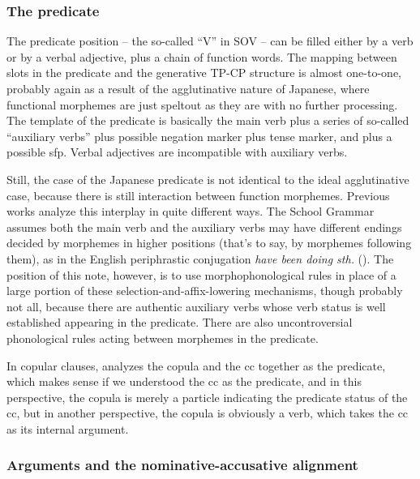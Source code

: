 \documentclass[UTF8, a4paper, oneside, scheme=plain]{ctexart}
\newcommand{\corpus}[1]{\emph{#1}}
\begin{document}
\subsubsection{The predicate}\label{sec:predicate-abs}

The predicate position -- the so-called ``V'' in SOV -- 
can be filled either by a verb or by a verbal adjective,
plus a chain of function words.
The mapping between slots in the predicate and the generative TP-CP structure is almost one-to-one,
probably again as a result of the agglutinative nature of Japanese,
where functional morphemes are just speltout as they are with no further processing.
The template of the predicate is basically
the main verb plus a series of so-called ``auxiliary verbs'' 
plus possible negation marker plus tense marker,
and plus a possible \ac{sfp}. 
Verbal adjectives are incompatible with auxiliary verbs.

Still, the case of the Japanese predicate is not identical to the ideal agglutinative case,
because there is still interaction between function morphemes.
Previous works analyze this interplay in quite different ways.
The School Grammar assumes both the main verb and the auxiliary verbs may have different endings 
decided by morphemes in higher positions (that's to say, by morphemes following them),
as in the English periphrastic conjugation \corpus{have been doing sth.}
().
The position of this note, however, is to use morphophonological rules 
in place of a large portion of these selection-and-affix-lowering mechanisms,
though probably not all,
because there are authentic auxiliary verbs whose verb status is well established 
appearing in the predicate.
There are also uncontroversial phonological rules acting between morphemes in the predicate.

In copular clauses,
\citet{tsutsui1989dictionary} analyzes the copula and the \acs{cc} together as the predicate,
which makes sense if we understood the \acs{cc} as the predicate,
and in this perspective, the copula is merely a particle indicating the predicate status of the \acs{cc},
but in another perspective, the copula is obviously a verb,
which takes the \acs{cc} as its internal argument.

\subsubsection{Arguments and the nominative-accusative alignment}\label{sec:alignment}
\end{document}

